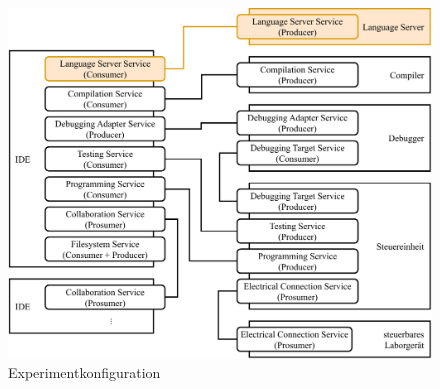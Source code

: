 \begin{figure}[htbp]
    \centering
    \includegraphics[width=\textwidth]{diagrams/experimentkonfigurationen/Experimentkonfiguration-06.drawio.pdf}
    \caption{Experimentkonfiguration}
    \label{figure:experimentkonfiguration:language-server}
\end{figure}
